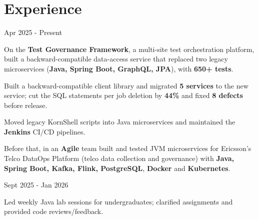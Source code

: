 \documentclass[]{deedy-resume-reversed}
\begin{document}
\section{Experience}
\vspace{0.1 cm}
    \begin{twocolentry}{
       Apr 2025 - Present
    }
        \runsubsection{}\end{twocolentry}

    \vspace{0.10 cm}
    \begin{onecolentry}
        \begin{highlights}
              \item On the \textbf{Test Governance Framework}, a multi-site test orchestration platform, built a backward-compatible data-access service that replaced two legacy microservices (\textbf{Java, Spring Boot, GraphQL, JPA}), with \textbf{650+ tests}.
              \item Built a backward-compatible client library and migrated \textbf{5 services} to the new service; cut the SQL statements per job deletion by \textbf{44\%} and fixed \textbf{8 defects} before release.
              \item Moved legacy KornShell scripts into Java microservices and maintained the \textbf{Jenkins} CI/CD pipelines.
              \item Before that, in an \textbf{Agile} team built and tested JVM microservices for Ericsson’s Telco DataOps Platform (telco data collection and governance) with \textbf{Java, Spring Boot, Kafka, Flink, PostgreSQL}, \textbf{Docker} and \textbf{Kubernetes}.
        \end{highlights}
    \end{onecolentry}

    \vspace{0.3 cm}
    \begin{twocolentry}{
       Sept 2025 - Jan 2026
    }
        \runsubsection{}\end{twocolentry}

    \vspace{0.10 cm}
    \begin{onecolentry}
        \begin{highlights}
              \item Led weekly Java lab sessions for undergraduates; clarified assignments and provided code reviews/feedback.
        \end{highlights}
    \end{onecolentry}
\end{document}
